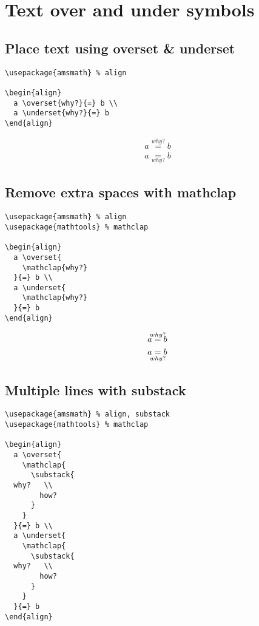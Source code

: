 \documentclass[../../latex]{subfiles}
\begin{document}
\section{Text over and under symbols}

\subsection{Place text using overset \& underset}

\begin{verbatim}
\usepackage{amsmath} % align

\begin{align}
  a \overset{why?}{=} b \\
  a \underset{why?}{=} b
\end{align}
\end{verbatim}

\begin{align}
  a \overset{why?}{=} b \\
  a \underset{why?}{=} b
\end{align}

\subsection{Remove extra spaces with mathclap}

\begin{verbatim}
\usepackage{amsmath} % align
\usepackage{mathtools} % mathclap

\begin{align}
  a \overset{
    \mathclap{why?}
  }{=} b \\
  a \underset{
    \mathclap{why?}
  }{=} b
\end{align}
\end{verbatim}

\begin{align}
  a \overset{
    \mathclap{why?}
  }{=} b \\
  a \underset{
    \mathclap{why?}
  }{=} b
\end{align}

\subsection{Multiple lines with substack}

\begin{verbatim}
\usepackage{amsmath} % align, substack
\usepackage{mathtools} % mathclap

\begin{align}
  a \overset{
    \mathclap{
      \substack{
  why?   \\
        how?
      }
    }
  }{=} b \\
  a \underset{
    \mathclap{
      \substack{
  why?   \\
        how?
      }
    }
  }{=} b
\end{align}
\end{verbatim}
\end{document}
